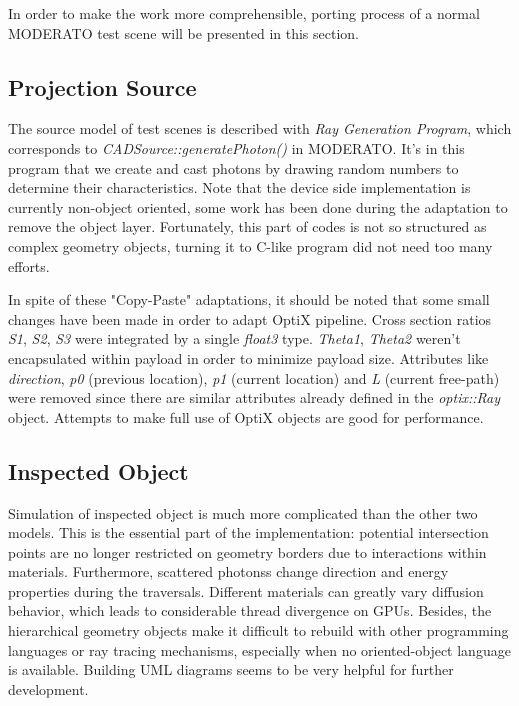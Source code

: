 In order to make the work more comprehensible, porting process of a normal MODERATO test scene will be presented in this section.


\subsection{Projection Source}
The source model of test scenes is described with \textit{Ray Generation Program}, which corresponds to \textit{CADSource::generatePhoton()} in MODERATO. It's in this program that we create and cast photons by drawing random numbers to determine their characteristics. Note that the device side implementation is currently non-object oriented, some work has been done during the adaptation to remove the object layer. Fortunately, this part of codes is not so structured as complex geometry objects, turning it to C-like program did not need too many efforts.

In spite of these "Copy-Paste" adaptations, it should be noted that some small changes have been made in order to adapt OptiX pipeline. Cross section ratios \textit{S1}, \textit{S2}, \textit{S3} were integrated by a single \textit{float3} type. \textit{Theta1}, \textit{Theta2} weren't encapsulated within payload in order to minimize payload size. Attributes like \textit{direction}, \textit{p0} (previous location), \textit{p1} (current location) and \textit{L} (current free-path) were removed since there are similar attributes already defined in the \textit{optix::Ray} object. Attempts to make full use of OptiX objects are good for performance.


\subsection{Inspected Object}
Simulation of inspected object is much more complicated than the other two models. This is the essential part of the implementation: potential intersection points are no longer restricted on geometry borders due to interactions within materials. Furthermore, scattered photonss change direction and energy properties during the traversals. Different materials can greatly vary diffusion behavior, which leads to considerable thread divergence on GPUs. Besides, the hierarchical geometry objects make it difficult to rebuild with other programming languages or ray tracing mechanisms, especially when no oriented-object language is available. Building UML diagrams seems to be very helpful for further development.

